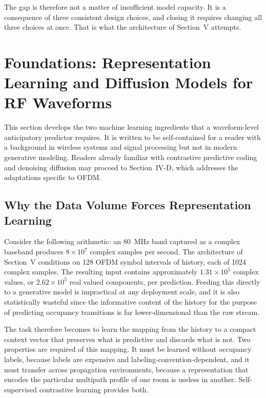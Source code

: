 \documentclass[lettersize,journal]{IEEEtran}
\begin{document}
The gap is therefore not a matter of insufficient model capacity. It is
a consequence of three consistent design choices, and closing it
requires changing all three choices at once. That is what the architecture of
Section~V attempts.

\section{\textbf{Foundations: Representation Learning and Diffusion Models for RF Waveforms}}

This section develops the two machine learning ingredients that a
waveform-level anticipatory predictor requires. It is written to be
self-contained for a reader with a background in wireless systems and
signal processing but not in modern generative modeling. Readers already
familiar with contrastive predictive coding and denoising diffusion may
proceed to Section~IV-D, which addresses the adaptations specific to
OFDM.

\subsection{\textbf{Why the Data Volume Forces Representation Learning}}
Consider the following arithmetic: an 80~MHz band captured 
as a complex baseband produces $8\times10^{7}$ complex samples per second. The
architecture of Section~V conditions on 128 OFDM symbol intervals of history, each of
1024 complex samples. The resulting input contains approximately 
$1.31\times10^{5}$ complex values, or
$2.62\times10^{5}$ real valued components, per prediction. Feeding this directly to
a generative model is impractical at any deployment scale, and it is
also statistically wasteful since the informative content of the history for
the purpose of predicting occupancy transitions is far
lower-dimensional than the raw stream.

The task therefore becomes to learn the mapping from the history to a compact
context vector that preserves what is predictive and discards what is
not. Two properties are required of this mapping. It must be learned
without occupancy labels, because labels are expensive and
labeling-convention-dependent, and it must transfer across propagation
environments, because a representation that encodes the particular
multipath profile of one room is useless in another. Self-supervised
contrastive learning provides both.
\end{document}
